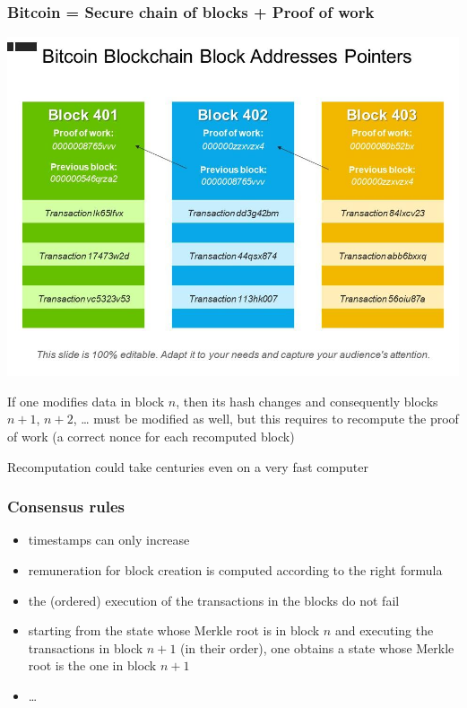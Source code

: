 \documentclass[11pt]{beamer}  %
\begin{document}
\begin{frame}\frametitle{Bitcoin = Secure chain of blocks + Proof of work}

  \begin{center}
    \includegraphics[scale=0.28,clip=false]{pictures/blocks-pow.jpg}
  \end{center}

  \smallskip

  If one modifies data in block $n$, then its hash changes and consequently
  blocks $n+1$, $n+2$, \ldots
  must be modified as well, but this requires to recompute the proof of work
  (a correct nonce for each recomputed block)

  \smallskip

  \begin{redbox}{}
    Recomputation could take centuries even on a very fast computer
  \end{redbox}
\end{frame}

\begin{frame}\frametitle{Consensus rules}

  \begin{itemize}
  \item timestamps can only increase
  \item remuneration for block creation is computed according to the right formula
  \item the (ordered) execution of the transactions in the blocks do not fail
  \item starting from the state whose Merkle root is in block $n$ and executing
    the transactions in block $n+1$ (in their order), one obtains a state whose Merkle root is
    the one in block $n+1$
  \item \ldots
  \end{itemize}
\end{frame}
\end{document}

